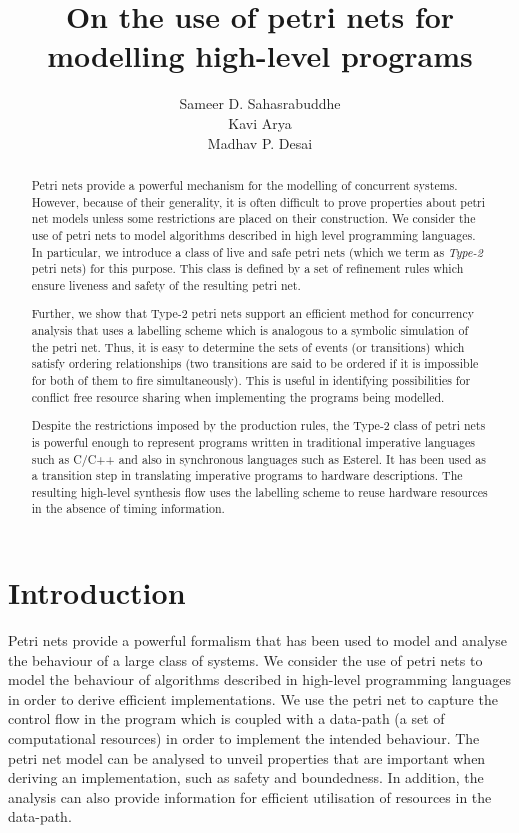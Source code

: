 \documentclass[12pt,a4paper]{article}
\title{On the use of petri nets for modelling high-level programs}
\author{Sameer D. Sahasrabuddhe \\ Kavi Arya \\ Madhav P. Desai}
\date{}
\begin{document}
\maketitle

\begin{abstract}

  Petri nets provide a powerful mechanism for the modelling of
  concurrent systems. However, because of their generality, it is
  often difficult to prove properties about petri net models unless
  some restrictions are placed on their construction. We consider the
  use of petri nets to model algorithms described in high level
  programming languages. In particular, we introduce a class of live
  and safe petri nets (which we term as {\em Type-2} petri nets) for
  this purpose. This class is defined by a set of refinement rules
  which ensure liveness and safety of the resulting petri net.
  
  Further, we show that Type-2 petri nets support an efficient method
  for concurrency analysis that uses a labelling scheme which is
  analogous to a symbolic simulation of the petri net. Thus, it is
  easy to determine the sets of events (or transitions) which satisfy
  ordering relationships (two transitions are said to be ordered if it
  is impossible for both of them to fire simultaneously). This is
  useful in identifying possibilities for conflict free resource
  sharing when implementing the programs being modelled.

  Despite the restrictions imposed by the production rules, the Type-2
  class of petri nets is powerful enough to represent programs written
  in traditional imperative languages such as C/C++ and also in
  synchronous languages such as Esterel. It has been used as a
  transition step in translating imperative programs to hardware
  descriptions\cite{ahir-thesis}. The resulting high-level synthesis
  flow uses the labelling scheme to reuse hardware resources in the
  absence of timing information.

\end{abstract}

\section{Introduction}
\label{sec:introduction}

Petri nets provide a powerful formalism that has been used to model
and analyse the behaviour of a large class of systems. We consider the
use of petri nets to model the behaviour of algorithms described in
high-level programming languages in order to derive efficient
implementations. We use the petri net to capture the control flow in
the program which is coupled with a data-path (a set of computational
resources) in order to implement the intended behaviour. The petri net
model can be analysed to unveil properties that are important when
deriving an implementation, such as safety and boundedness. In
addition, the analysis can also provide information for efficient
utilisation of resources in the data-path.
\end{document}
